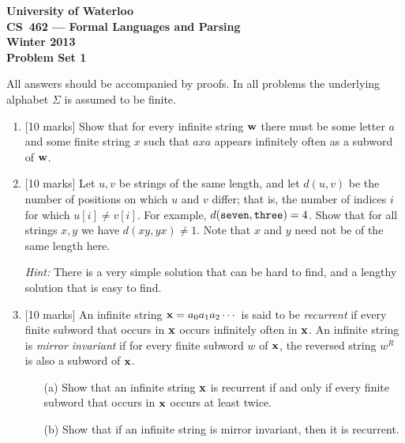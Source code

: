 \documentclass[12pt]{article}
\begin{document}
\begin{center}
\large\bf University of Waterloo\\
CS~462 --- Formal Languages and Parsing\\
Winter 2013\\
Problem Set 1\\
\end{center}

\bigskip


\smallskip


\bigskip\bigskip

All answers should be accompanied by proofs.  In all problems the underlying
alphabet $\Sigma$ is assumed to be finite.

\begin{enumerate}

\item{} [10 marks]  
Show that for every infinite string $\bf w$ there must be some letter
$a$ and some finite string $x$ such that $axa$ appears infinitely often as a
subword of $\bf w$.

\medskip

\item{} [10 marks]  
Let $u, v$ be strings of the same length, and let
$d(u,v)$ be the number of positions on which $u$ and $v$ differ; that is,
the number of indices $i$ for which $u[i] \not= v[i]$.    
For example, $d({\tt seven},{\tt three}) = 4$.  Show that for all
strings $x,y$ we have $d(xy, yx) \not= 1$.  Note that $x$ and $y$ need
not be of the same length here.

{\it Hint:}  There is a very simple solution that can be hard to find,
and a lengthy solution that is easy to find.

\medskip

\item{} [10 marks]  An infinite string ${\bf x} = a_0 a_1 a_2 \cdots$
is said to be {\sl recurrent} if every
finite subword that occurs in $\bf x$ occurs infinitely often in $\bf x$.
An infinite string is {\sl mirror invariant} if for every finite subword $w$ of
$\bf x$, the reversed string $w^R$ is also a subword of $\bf x$.

\begin{itemize}

\item[(a)]  Show that an infinite string $\bf x$ is recurrent if and only
if every
finite subword that occurs in $\bf x$ occurs at least twice.

\item[(b)]  Show that if an infinite string is mirror invariant,
then it is recurrent.

\end{itemize}


\end{enumerate}
\end{document}
